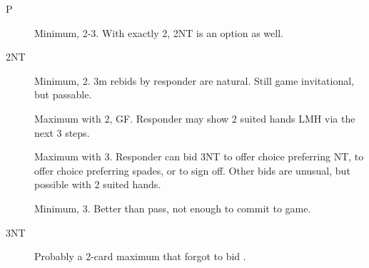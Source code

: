 \documentclass[tom-ari]{subfiles}
\begin{document}
\begin{description}
  \item[P] Minimum, 2-3\spadesuit. With exactly 2, 2NT is an option as well.
  \item[2NT] Minimum, 2\spadesuit. 3m rebids by responder are natural. Still game invitational, but passable.
  \item[] Maximum with 2\spadesuit, GF. Responder may show 2 suited hands LMH via the next 3 steps.
  \item[] Maximum with 3\spadesuit. Responder can bid 3NT to offer choice preferring NT,  to offer choice preferring spades, or  to sign off.
                     Other bids are unusual, but possible with 2 suited hands.
  \item[] Minimum, 3\spadesuit. Better than pass, not enough to commit to game.
  \item[3NT] Probably a 2-card maximum that forgot to bid .
\end{description}
\end{document}
